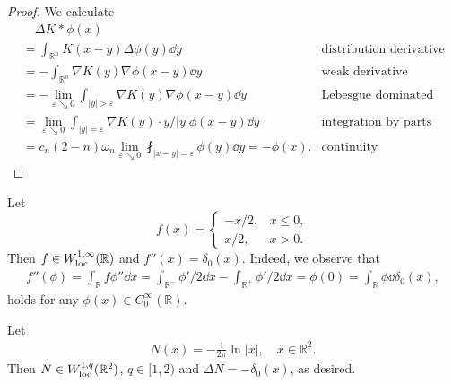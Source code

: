 \begin{proof}
  We calculate 
  \begin{align*}
    &\quad\Delta K*\phi(x)\\
    &= \int_{\mathbb R^n}K(x-y)\Delta\phi(y)\dd y & \text{distribution derivative}\\ 
    &= -\int_{\mathbb R^n}\nabla K(y)\nabla\phi(x-y)\dd y
    & \text{weak derivative}\\
    &= - \lim_{\varepsilon\searrow0}\int_{|y|>\varepsilon}\nabla K(y)\nabla \phi(x-y)\dd y
    & \text{Lebesgue dominated convergence theorem}\\
    &= \lim_{\varepsilon\searrow0}\int_{|y|=\varepsilon}\nabla K(y)\cdot y/|y|\phi(x-y)\dd y
    & \text{integration by parts}\\
    &= c_n(2-n)\omega_n\lim_{\varepsilon\searrow0}\fint_{|x-y|=\varepsilon}\phi(y)\dd y
    = -\phi(x).
    & \text{continuity}
  \end{align*}
\end{proof}

\begin{remark}
  Let 
  \begin{equation*}
    f(x) = 
    \begin{cases}
      -x/2, & x\leq 0,\\
      x/2, & x>0.
    \end{cases}
  \end{equation*}
  Then $f\in W_{\operatorname*{loc}}^{1,\infty}(\mathbb R)$ and $f''(x) = \delta_0(x)$.
  Indeed,
  we observe that 
  \begin{align*}
    f''(\phi) = \int_{\mathbb R}  f\phi''\dd x 
    = \int_{\mathbb R^-}  \phi'/2\dd x - \int_{\mathbb R^+}\phi'/2\dd x 
    = \phi(0) = \int_{\mathbb R}\phi\dd\delta_0(x),
  \end{align*}
  holds for any $\phi(x)\in C^\infty_0(\mathbb R)$.
\end{remark}

\begin{remark}
Let 
  \begin{align*}
    N(x) = -\frac{1}{2\pi}\ln|x|,\quad x\in\mathbb R^2.
  \end{align*}
Then $N\in W^{1,q}_{\operatorname*{loc}}(\mathbb R^2)$, $q\in[1,2)$ and $\Delta N = -\delta_0(x)$,
as desired.
\end{remark}

